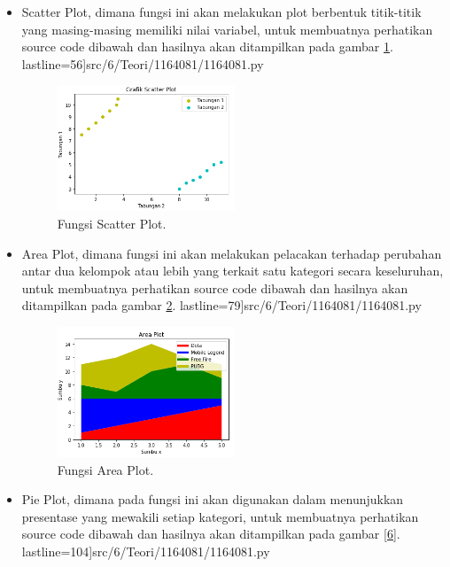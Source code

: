 \begin{itemize}
	\item Scatter Plot, dimana fungsi ini akan melakukan plot berbentuk titik-titik yang masing-masing memiliki nilai variabel, 				         untuk membuatnya perhatikan source code dibawah dan hasilnya akan ditampilkan pada gambar \ref{4}.
	         lastline=56]{src/6/Teori/1164081/1164081.py}

	        \begin{figure}[!htbp!]
			\centerline{\includegraphics[width=0.5\textwidth]{figures/6/Teori/1164081/1164081_4.png}}
			\caption{Fungsi Scatter Plot.}
			\label{4}
		\end{figure}

	\item Area Plot, dimana fungsi ini akan melakukan pelacakan terhadap perubahan antar dua kelompok atau lebih yang 				         terkait satu kategori secara keseluruhan, untuk membuatnya perhatikan source code dibawah dan hasilnya akan 				         ditampilkan pada gambar \ref{5}.
	         lastline=79]{src/6/Teori/1164081/1164081.py}

	         \begin{figure}[!htbp!]
			\centerline{\includegraphics[width=0.5\textwidth]{figures/6/Teori/1164081/1164081_5.png}}
			\caption{Fungsi Area Plot.}
			\label{5}
		\end{figure}

	\item Pie Plot, dimana pada fungsi ini akan digunakan dalam menunjukkan presentase yang mewakili setiap kategori, untuk 			         membuatnya perhatikan source code dibawah dan hasilnya akan ditampilkan pada gambar \ref{6}.
	          lastline=104]{src/6/Teori/1164081/1164081.py}


\end{itemize}
